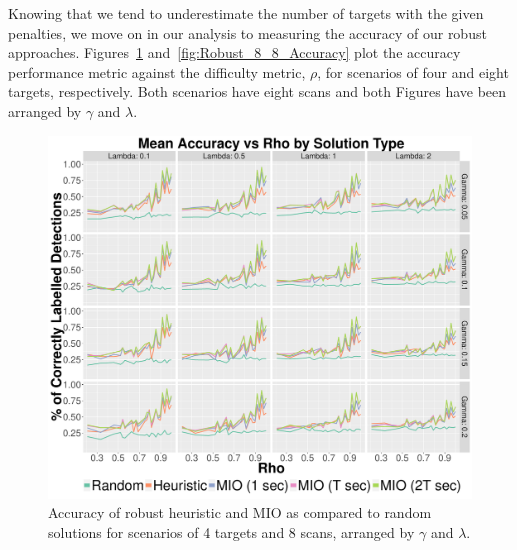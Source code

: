 Knowing that we tend to underestimate the number of targets with the given penalties, we move on in our analysis to measuring the accuracy of our robust approaches. Figures~\ref{fig:Robust_4_8_Accuracy} and~\ref{fig:Robust_8_8_Accuracy} plot the accuracy performance metric against the difficulty metric, $\rho$, for scenarios of four and eight targets, respectively. Both scenarios have eight scans and both Figures have been arranged by $\gamma$ and $\lambda$.
\begin{figure}[ht]
  \centering
  \includegraphics[width=\columnwidth]{../Figures/4_8_Accuracy}
  \caption{Accuracy of robust heuristic and MIO as compared to random solutions for scenarios of 4 targets and 8 scans, arranged by $\gamma$ and $\lambda$.}
  \label{fig:Robust_4_8_Accuracy}
\end{figure}

